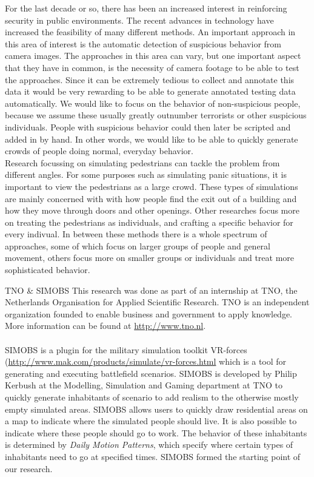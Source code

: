 \documentclass[11pt, a4paper]{book}
\begin{document}
For the last decade or so, there has been an increased interest in reinforcing security in public environments. The recent advances in technology have increased the feasibility of many different methods. An important approach in this area of interest is the automatic detection of suspicious behavior from camera images. The approaches in this area can vary, but one important aspect that they have in common, is the necessity of camera footage to be able to test the approaches. Since it can be extremely tedious to collect and annotate this data it would be very rewarding to be able to generate annotated testing data automatically. We would like to focus on the behavior of non-suspicious people, because we assume these usually greatly outnumber terrorists or other suspicious individuals. People with suspicious behavior could then later be scripted and added in by hand. In other words, we would like to be able to quickly generate crowds of people doing normal, everyday behavior.\\

Research focussing on simulating pedestrians can tackle the problem from different angles. For some purposes such as simulating panic situations, it is important to view the pedestrians as a large crowd. These types of simulations are mainly concerned with with how people find the exit out of a building and how they move through doors and other openings. Other researches focus more on treating the pedestrians as individuals, and crafting a specific behavior for every indivual. In between these methods there is a whole spectrum of approaches, some of which focus on larger groups of people and general movement, others focus more on smaller groups or individuals and treat more sophisticated behavior.\\
\begin{bclogo}[logo=\bctrombone]{TNO \& SIMOBS}
This research was done as part of an internship at TNO, the Netherlands Organisation for Applied Scientific Research.  TNO is an independent organization founded to enable business and government to apply knowledge. More information can be found at \url{http://www.tno.nl}.\\\\
SIMOBS is a plugin for the military simulation toolkit VR-forces (\url{http://www.mak.com/products/simulate/vr-forces.html} which is a tool for generating and executing battlefield scenarios. SIMOBS is developed by Philip Kerbush at the Modelling, Simulation and Gaming department at TNO to quickly generate inhabitants of scenario to add realism to the otherwise mostly empty simulated areas. SIMOBS allows users to quickly draw residential areas on a map to indicate where the simulated people should live. It is also possible to indicate where these people should go to work. The behavior of these inhabitants is determined by \emph{Daily Motion Patterns}, which specify where certain types of inhabitants need to go at specified times. SIMOBS formed the starting point of our research.
\end{bclogo}
\end{document}
